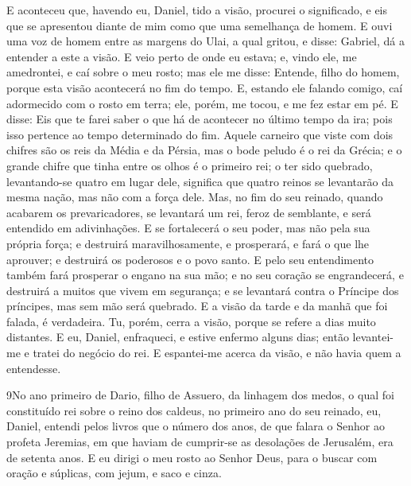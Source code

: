 E aconteceu que, havendo eu, Daniel, tido a visão, procurei o
significado, e eis que se apresentou diante de mim como que uma
semelhança de homem. E ouvi uma voz de homem entre as margens
do Ulai, a qual gritou, e disse: Gabriel, dá a entender a este a
visão. E veio perto de onde eu estava; e, vindo ele, me
amedrontei, e caí sobre o meu rosto; mas ele me disse: Entende,
filho do homem, porque esta visão acontecerá no fim do tempo.
E, estando ele falando comigo, caí adormecido com o rosto em
terra; ele, porém, me tocou, e me fez estar em pé. E disse:
Eis que te farei saber o que há de acontecer no último tempo da ira;
pois isso pertence ao tempo determinado do fim. Aquele
carneiro que viste com dois chifres são os reis da Média e da
Pérsia, mas o bode peludo é o rei da Grécia; e o grande
chifre que tinha entre os olhos é o primeiro rei; o ter sido
quebrado, levantando-se quatro em lugar dele, significa que quatro
reinos se levantarão da mesma nação, mas não com a força dele.
Mas, no fim do seu reinado, quando acabarem os
prevaricadores, se levantará um rei, feroz de semblante, e será
entendido em adivinhações. E se fortalecerá o seu poder, mas
não pela sua própria força; e destruirá maravilhosamente, e
prosperará, e fará o que lhe aprouver; e destruirá os poderosos e o
povo santo. E pelo seu entendimento também fará prosperar o
engano na sua mão; e no seu coração se engrandecerá, e destruirá a
muitos que vivem em segurança; e se levantará contra o Príncipe dos
príncipes, mas sem mão será quebrado. E a visão da tarde e da
manhã que foi falada, é verdadeira. Tu, porém, cerra a visão, porque
se refere a dias muito distantes. E eu, Daniel, enfraqueci, e
estive enfermo alguns dias; então levantei-me e tratei do negócio do
rei. E espantei-me acerca da visão, e não havia quem a entendesse.

\medskip

\lettrine{9} No ano primeiro de Dario, filho de Assuero, da
linhagem dos medos, o qual foi constituído rei sobre o reino dos
caldeus, no primeiro ano do seu reinado, eu, Daniel, entendi
pelos livros que o número dos anos, de que falara o Senhor ao
profeta Jeremias, em que haviam de cumprir-se as desolações de
Jerusalém, era de setenta anos. E eu dirigi o meu rosto ao
Senhor Deus, para o buscar com oração e súplicas, com jejum, e saco
e cinza.

